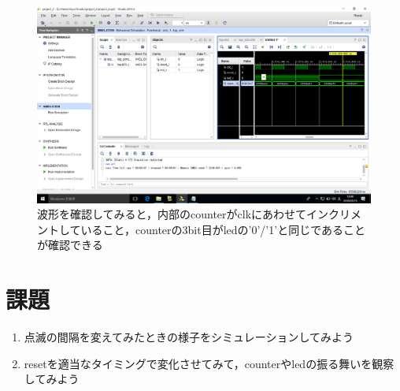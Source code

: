 \documentclass[a4paper,dvipdfmx]{jsarticle}
\begin{document}
 \begin{figure}[H]
  \begin{center}
   \includegraphics[width=.8\textwidth]{chapter04_figures/VirtualBox_Windows10_19_03_2018_12_09_39.png}
  \end{center}
  \caption{波形を確認してみると，内部のcounterがclkにあわせてインクリメントしていること，counterの3bit目がledの'0'/'1'と同じであることが確認できる}
 \end{figure}

\section{課題}
\begin{enumerate}
 \item 点滅の間隔を変えてみたときの様子をシミュレーションしてみよう
 \item resetを適当なタイミングで変化させてみて，counterやledの振る舞いを観察してみよう
\end{enumerate}
\end{document}
